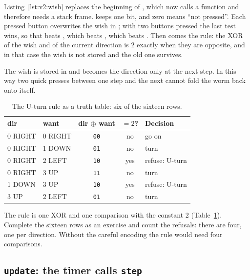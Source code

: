 Listing~\ref{lst:v2:wish} replaces the beginning of ,
which now calls a function and therefore needs a stack frame. 
keeps one bit, and zero means ``not pressed''. Each pressed button overwrites
the wish in ; with two buttons pressed the last test wins, so that
 beats , which beats , which beats .
Then comes the rule: the XOR of the wish and of the current direction is 2
exactly when they are opposite, and in that case the wish is not stored and
the old one survives.

The wish is stored in  and becomes the direction only at the next
step. In this way two quick presses between one step and the next cannot fold
the worm back onto itself.

\begin{table}[htb]
\centering\small
\caption{The U-turn rule as a truth table: six of the sixteen rows.}\label{tab:v2:uturn}
\begin{tabular}{@{}llccl@{}}
\toprule
\textbf{dir} & \textbf{want} & \textbf{dir $\oplus$ want} & \textbf{$=2$?} & \textbf{Decision}\\
\midrule
0 RIGHT & 0 RIGHT & \texttt{00} & no & go on\\
0 RIGHT & 1 DOWN & \texttt{01} & no & turn\\
0 RIGHT & 2 LEFT & \texttt{10} & yes & refuse: U-turn\\
0 RIGHT & 3 UP & \texttt{11} & no & turn\\
1 DOWN & 3 UP & \texttt{10} & yes & refuse: U-turn\\
3 UP & 2 LEFT & \texttt{01} & no & turn\\
\bottomrule
\end{tabular}
\end{table}

The rule is one XOR and one comparison with the constant 2
(Table~\ref{tab:v2:uturn}). Complete the sixteen rows as an exercise and
count the refusals: there are four, one per direction. Without the careful
encoding the rule would need four comparisons.

\subsection{\texttt{update}: the timer calls \texttt{step}}


